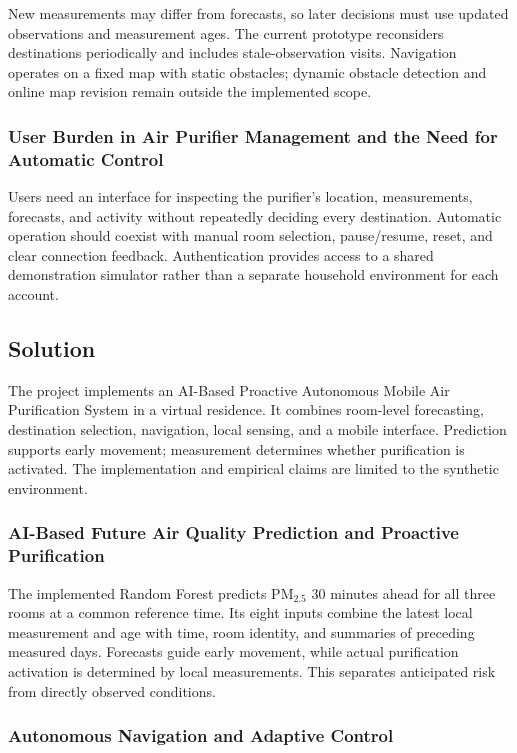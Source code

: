 \documentclass[conference]{IEEEtran}
\newcommand{\pmfine}{\ensuremath{\mathrm{PM}_{2.5}}}
\begin{document}
New measurements may differ from forecasts, so later decisions must use updated observations and measurement ages. The current prototype reconsiders destinations periodically and includes stale-observation visits. Navigation operates on a fixed map with static obstacles; dynamic obstacle detection and online map revision remain outside the implemented scope.

\subsubsection{User Burden in Air Purifier Management and the Need for Automatic Control}

Users need an interface for inspecting the purifier's location, measurements, forecasts, and activity without repeatedly deciding every destination. Automatic operation should coexist with manual room selection, pause/resume, reset, and clear connection feedback. Authentication provides access to a shared demonstration simulator rather than a separate household environment for each account.

\subsection{Solution}

The project implements an AI-Based Proactive Autonomous Mobile Air Purification System in a virtual residence. It combines room-level forecasting, destination selection, navigation, local sensing, and a mobile interface. Prediction supports early movement; measurement determines whether purification is activated. The implementation and empirical claims are limited to the synthetic environment.

\subsubsection{AI-Based Future Air Quality Prediction and Proactive Purification}

The implemented Random Forest predicts \pmfine{} 30 minutes ahead for all three rooms at a common reference time. Its eight inputs combine the latest local measurement and age with time, room identity, and summaries of preceding measured days. Forecasts guide early movement, while actual purification activation is determined by local measurements. This separates anticipated risk from directly observed conditions.

\subsubsection{Autonomous Navigation and Adaptive Control}
\end{document}

